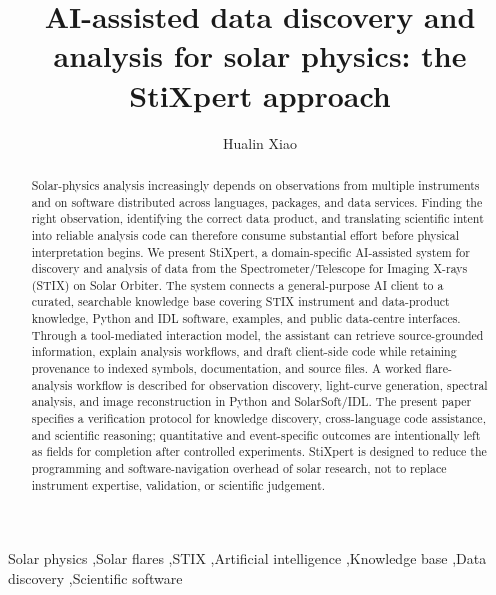 \documentclass[preprint,review,12pt]{elsarticle}
\begin{document}
\begin{frontmatter}

\title{AI-assisted data discovery and analysis for solar physics: the StiXpert approach}

\author[inst1,inst2]{Hualin Xiao}

\address[inst1]{University of Applied Sciences and Arts Northwestern Switzerland (FHNW), Switzerland}
\address[inst2]{Physikalisch-Meteorologisches Observatorium Davos/World Radiation Center (PMOD/WRC), Davos, Switzerland}

\begin{abstract}
Solar-physics analysis increasingly depends on observations from multiple instruments and on software distributed across languages, packages, and data services. Finding the right observation, identifying the correct data product, and translating scientific intent into reliable analysis code can therefore consume substantial effort before physical interpretation begins. We present StiXpert, a domain-specific AI-assisted system for discovery and analysis of data from the Spectrometer/Telescope for Imaging X-rays (STIX) on Solar Orbiter. The system connects a general-purpose AI client to a curated, searchable knowledge base covering STIX instrument and data-product knowledge, Python and IDL software, examples, and public data-centre interfaces. Through a tool-mediated interaction model, the assistant can retrieve source-grounded information, explain analysis workflows, and draft client-side code while retaining provenance to indexed symbols, documentation, and source files. A worked flare-analysis workflow is described for observation discovery, light-curve generation, spectral analysis, and image reconstruction in Python and SolarSoft/IDL. The present paper specifies a verification protocol for knowledge discovery, cross-language code assistance, and scientific reasoning; quantitative and event-specific outcomes are intentionally left as fields for completion after controlled experiments. StiXpert is designed to reduce the programming and software-navigation overhead of solar research, not to replace instrument expertise, validation, or scientific judgement.
\end{abstract}

\begin{keyword}
Solar physics \sep Solar flares \sep STIX \sep Artificial intelligence \sep Knowledge base \sep Data discovery \sep Scientific software
\end{keyword}

\end{frontmatter}





\end{document}
